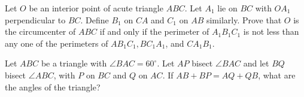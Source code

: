 \item[\textbf{G7.}]Let $O$ be an interior point of acute triangle $ABC$. Let $A_1$ lie on $BC$ with $OA_1$ perpendicular to $BC$. Define $B_1$ on $CA$ and $C_1$ on $AB$ similarly. Prove that $O$ is the circumcenter of $ABC$ if and only if the perimeter of $A_1B_1C_1$ is not less than any one of the perimeters of $AB_1C_1, BC_1A_1$,  and $CA_1B_1$.

\item[\textbf{G8.}]Let $ABC$ be a triangle with $\angle BAC = 60^{\circ}$. Let $AP$ bisect $\angle BAC$ and let $BQ$ bisect  $\angle ABC$,  with $P$ on $BC$ and $Q$ on $AC$. If $AB + BP = AQ + QB$,  what are the angles of the triangle?